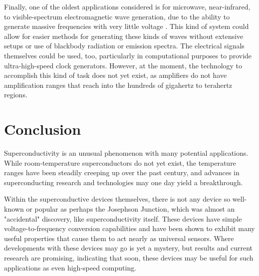 \documentclass[letterpaper,english,reprint, aps]{revtex4-1}
\begin{document}
Finally, one of the oldest applications considered is for microwave, near-infrared, to visible-spectrum electromagnetic wave generation, due to the ability to generate massive frequencies with very little voltage \citep{jj_wave}. This kind of system could allow for easier methods for generating these kinds of waves without extensive setups or use of blackbody radiation or emission spectra. The electrical signals themselves could be used, too, particularly in computational purposes to provide ultra-high-speed clock generators. However, at the moment, the technology to accomplish this kind of task does not yet exist, as amplifiers do not have amplification ranges that reach into the hundreds of gigahertz to terahertz regions.

\section{Conclusion}
Superconductivity is an unusual phenomenon with many potential applications. While room-temperature superconductors do not yet exist, the temperature ranges have been steadily creeping up over the past century, and advances in superconducting research and technologies may one day yield a breakthrough.

Within the superconductive devices themselves, there is not any device so well-known or popular as perhaps the Josephson Junction, which was almost an "accidental" discovery, like superconductivity itself. These devices have simple voltage-to-frequency conversion capabilities and have been shown to exhibit many useful properties that cause them to act nearly as universal sensors. Where developments with these devices may go is yet a mystery, but results and current research are promising, indicating that soon, these devices may be useful for such applications as even high-speed computing.
\end{document}
